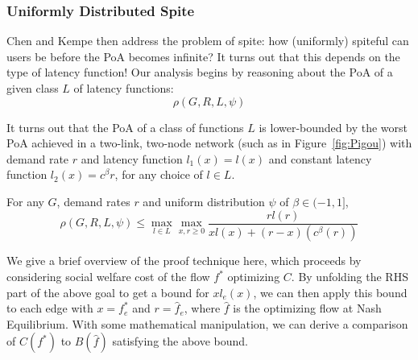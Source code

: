 \subsubsection{Uniformly Distributed Spite}
Chen and Kempe then address the problem of spite: how (uniformly) spiteful can users be before the PoA becomes infinite?
It turns out that this depends on the type of latency function! Our analysis begins by reasoning about the PoA of a given class ${L}$ of latency functions: 
$$\rho(G,R,{L},\psi)$$ 

It turns out that the PoA of a class of functions $L$ is lower-bounded by the worst PoA achieved in a two-link, two-node network (such as in Figure~\ref{fig:Pigou}) with demand rate $r$ and latency function $l_1(x) = l(x)$ and constant latency function $l_2(x) = c^\beta{r}$, for any choice of $l \in L$.
\begin{theorem}
For any $G$, demand rates $r$ and uniform distribution $\psi$ of $\beta \in (-1, 1]$,
$$\rho(G,R,{L},\psi) \le \max_{l\in{L}} \max_{x,r\ge 0} \frac{rl(r)}{xl(x) + (r-x)(c^\beta(r))}$$
\end{theorem}
\begin{proof-sketch}
    We give a brief overview of the proof technique here, which proceeds by considering social welfare cost of the flow $f^*$ optimizing $C$. By unfolding the RHS part of the above goal to get a bound for $xl_e(x)$, we can then apply this bound to each edge with $x = f^*_e$ and $r = \hat{f}_e$, where $\hat{f}$ is the optimizing flow at Nash Equilibrium. With some mathematical manipulation, we can derive a comparison of $C(f^*)$ to $B(\hat{f})$ satisfying the above bound.
\end{proof-sketch}

